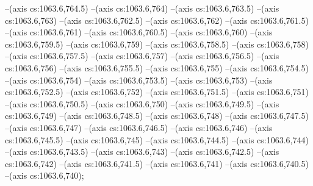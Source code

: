 --(axis cs:1063.6,764.5)
--(axis cs:1063.6,764)
--(axis cs:1063.6,763.5)
--(axis cs:1063.6,763)
--(axis cs:1063.6,762.5)
--(axis cs:1063.6,762)
--(axis cs:1063.6,761.5)
--(axis cs:1063.6,761)
--(axis cs:1063.6,760.5)
--(axis cs:1063.6,760)
--(axis cs:1063.6,759.5)
--(axis cs:1063.6,759)
--(axis cs:1063.6,758.5)
--(axis cs:1063.6,758)
--(axis cs:1063.6,757.5)
--(axis cs:1063.6,757)
--(axis cs:1063.6,756.5)
--(axis cs:1063.6,756)
--(axis cs:1063.6,755.5)
--(axis cs:1063.6,755)
--(axis cs:1063.6,754.5)
--(axis cs:1063.6,754)
--(axis cs:1063.6,753.5)
--(axis cs:1063.6,753)
--(axis cs:1063.6,752.5)
--(axis cs:1063.6,752)
--(axis cs:1063.6,751.5)
--(axis cs:1063.6,751)
--(axis cs:1063.6,750.5)
--(axis cs:1063.6,750)
--(axis cs:1063.6,749.5)
--(axis cs:1063.6,749)
--(axis cs:1063.6,748.5)
--(axis cs:1063.6,748)
--(axis cs:1063.6,747.5)
--(axis cs:1063.6,747)
--(axis cs:1063.6,746.5)
--(axis cs:1063.6,746)
--(axis cs:1063.6,745.5)
--(axis cs:1063.6,745)
--(axis cs:1063.6,744.5)
--(axis cs:1063.6,744)
--(axis cs:1063.6,743.5)
--(axis cs:1063.6,743)
--(axis cs:1063.6,742.5)
--(axis cs:1063.6,742)
--(axis cs:1063.6,741.5)
--(axis cs:1063.6,741)
--(axis cs:1063.6,740.5)
--(axis cs:1063.6,740);

